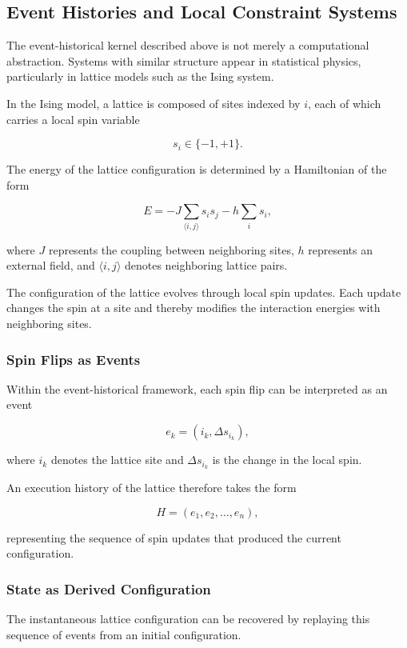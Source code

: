 \documentclass[12pt]{article}
\begin{document}
\subsection{Event Histories and Local Constraint Systems}

The event-historical kernel described above is not merely
a computational abstraction. Systems with similar structure
appear in statistical physics, particularly in lattice models
such as the Ising system.

In the Ising model, a lattice is composed of sites indexed by
$i$, each of which carries a local spin variable

\[
s_i \in \{-1, +1\}.
\]

The energy of the lattice configuration is determined by a
Hamiltonian of the form

\[
E = -J \sum_{\langle i,j \rangle} s_i s_j - h \sum_i s_i ,
\]

where $J$ represents the coupling between neighboring sites,
$h$ represents an external field, and $\langle i,j \rangle$
denotes neighboring lattice pairs.

The configuration of the lattice evolves through local spin
updates. Each update changes the spin at a site and thereby
modifies the interaction energies with neighboring sites.

\subsubsection{Spin Flips as Events}

Within the event-historical framework, each spin flip can be
interpreted as an event

\[
e_k = (i_k, \Delta s_{i_k}),
\]

where $i_k$ denotes the lattice site and $\Delta s_{i_k}$ is
the change in the local spin.

An execution history of the lattice therefore takes the form

\[
H = (e_1, e_2, \dots, e_n),
\]

representing the sequence of spin updates that produced the
current configuration.

\subsubsection{State as Derived Configuration}

The instantaneous lattice configuration can be recovered by
replaying this sequence of events from an initial configuration.
\end{document}
